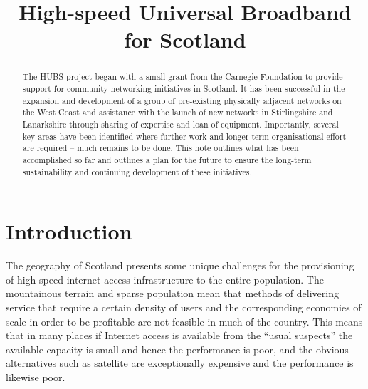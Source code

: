 \documentclass[a4paper,conference,onecolumn]{IEEEtran}
\begin{document}
\title{High-speed Universal Broadband for Scotland}
\author{
  \and
}
\maketitle

\begin{abstract}
  The HUBS project began with a small grant from the Carnegie
  Foundation to provide support for community networking initiatives in
  Scotland. It has been successful in the expansion and development of a
  group of pre-existing physically adjacent networks on the West Coast
  and assistance with the launch of new networks in Stirlingshire and
  Lanarkshire through sharing of expertise and loan of
  equipment. Importantly, several key areas have been identified where
  further work and longer term organisational effort are required --
  much remains to be done. This note outlines what has been
  accomplished so far and outlines a plan for the future to ensure 
  the long-term sustainability and continuing development of these
  initiatives.
\end{abstract}
\IEEEpeerreviewmaketitle

\section{Introduction}

The geography of Scotland presents some unique challenges for the
provisioning of high-speed internet access infrastructure to the
entire population. The mountainous terrain and sparse population mean
that methods of delivering service that require a certain density of
users and the corresponding economies of scale in order to be
profitable are not feasible in much of the country. This means
that in many places if Internet access is available from the ``usual
suspects'' the available capacity is small and hence the performance
is poor, and the obvious alternatives such as satellite are
exceptionally expensive and the performance is likewise poor.
\end{document}

